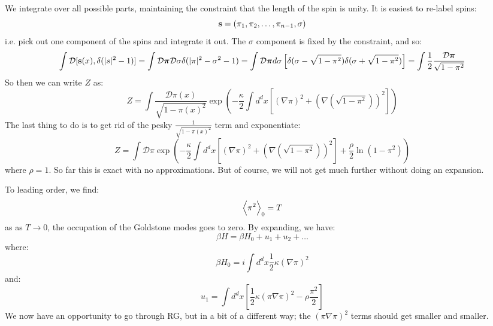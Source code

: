 We integrate over all possible parts, maintaining the constraint that the length of the spin is unity. It is easiest to re-label spins:
\begin{equation}
    \mathbf{s} = (\pi_1, \pi_2, \ldots, \pi_{n-1}, \sigma)
\end{equation}
i.e. pick out one component of the spins and integrate it out. The $\sigma$ component is fixed by the constraint, and so:
\begin{equation}
    \int \mathcal{D}[\mathbf{s}(x), \delta(\lvert s \rvert^2 - 1)] = \int \mathcal{D}\mbox{\boldmath$ \pi $}\mathcal{D}\sigma \delta(\lvert \pi \rvert^2 - \sigma^2 - 1) = \int \mathcal{D}\mbox{\boldmath$ \pi $}d\sigma\left[\delta(\sigma - \sqrt{1 - \pi^2})\delta(\sigma + \sqrt{1 - \pi^2})\right] = \int \frac{1}{2}\frac{\mathcal{D}\mbox{\boldmath$ \pi $}}{\sqrt{1 - \pi^2}}
\end{equation}
So then we can write $Z$ as:
\begin{equation}
    Z = \int \frac{\mathcal{D}\pi(x)}{\sqrt{1 - \pi(x)^2}}\exp(-\frac{\kappa}{2}\int d^dx \left[(\nabla \pi)^2 + (\nabla(\sqrt{1 - \pi^2}))^2\right])
\end{equation}
The last thing to do is to get rid of the pesky $\frac{1}{\sqrt{1 - \pi(x)^2}}$ term and exponentiate:
\begin{equation}
    Z = \int \mathcal{D}\pi \exp(-\frac{\kappa}{2}\int d^dx \left[(\nabla \pi)^2 + (\nabla(\sqrt{1 - \pi^2}))^2\right] + \frac{\rho}{2}\ln(1 - \pi^2))
\end{equation}
where $\rho = 1$. So far this is exact with no approximations. But of course, we will not get much further without doing an expansion. 

To leading order, we find:
\begin{equation}
    \left< \pi^2 \right>_0 = T
\end{equation}
as as $T \to 0$, the occupation of the Goldstone modes goes to zero. By expanding, we have:
\begin{equation}
    \beta H = \beta H_0 + u_1 + u_2 + \ldots
\end{equation}
where:
\begin{equation}
    \beta H_0 = i\int d^dx \frac{1}{2}\kappa(\nabla \pi)^2
\end{equation}
and:
\begin{equation}
    u_1 = \int d^{d}x\left[\frac{1}{2}\kappa(\pi \nabla \pi)^2 - \rho \frac{\pi^2}{2}\right]
\end{equation}
We now have an opportunity to go through RG, but in a bit of a different way; the $(\pi \nabla \pi)^2$ terms should get smaller and smaller.

